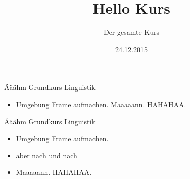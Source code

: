 \documentclass[]{beamer}
\author{Der gesamte Kurs}
\title{Hello Kurs}
\date{24.12.2015}
\begin{document}
\maketitle

\begin{frame}[fragile]{Ääähm Grundkurs Linguistik}
    \begin{itemize}
    \item Umgebung Frame aufmachen. Maaaaann. HAHAHAA.
    \end{itemize}
\end{frame}


\begin{frame}[fragile]{Ääähm Grundkurs Linguistik}
    \begin{itemize}[<+->]
        \item Umgebung Frame aufmachen.
        \item aber nach und nach
        \item Maaaaann. HAHAHAA.
    \end{itemize}
\end{frame}

\end{document}

